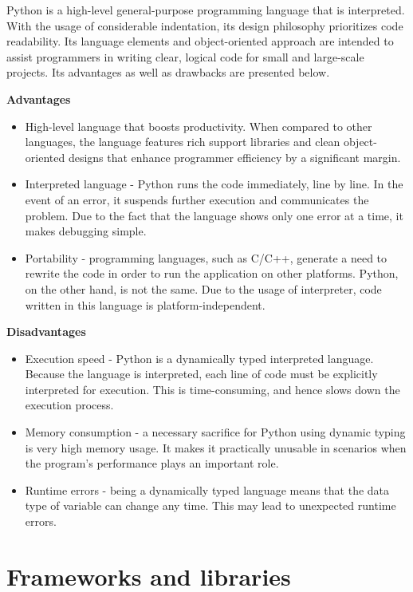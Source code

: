 Python \cite{python} is a high-level general-purpose programming language that is interpreted. With the usage of considerable indentation, its design philosophy prioritizes code readability. Its language elements and object-oriented approach are intended to assist programmers in writing clear, logical code for small and large-scale projects. Its advantages as well as drawbacks are presented below.

\textbf{Advantages}
\begin{itemize}
    \item High-level language that boosts productivity. When compared to other languages, the language features rich support libraries and clean object-oriented designs that enhance programmer efficiency by a significant margin.
    \item Interpreted language - Python runs the code immediately, line by line. In the event of an error, it suspends further execution and communicates the problem. Due to the fact that the language shows only one error at a time, it makes debugging simple.
    \item Portability - programming languages, such as C/C++, generate a need to rewrite the code in order to run the application on other platforms. Python, on the other hand, is not the same. Due to the usage of interpreter, code written in this language is platform-independent.

\end{itemize}

\textbf{Disadvantages}
\begin{itemize}
    \item Execution speed - Python is a dynamically typed interpreted language. Because the language is interpreted, each line of code must be explicitly interpreted for execution. This is time-consuming, and hence slows down the execution process.
    \item Memory consumption - a necessary sacrifice for Python using dynamic typing is very high memory usage. It makes it practically unusable in scenarios when the program's performance plays an important role.
    \item Runtime errors - being a dynamically typed language means that the data type of variable can change any time. This may lead to unexpected runtime errors.
\end{itemize}

\section{Frameworks and libraries}

